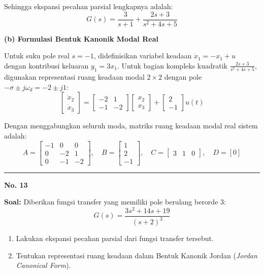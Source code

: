 \documentclass[11pt,a4paper]{article}
\begin{document}
Sehingga ekspansi pecahan parsial lengkapnya adalah:
$$G(s) = \frac{3}{s+1} + \frac{2s + 3}{s^2 + 4s + 5}$$

\textbf{(b) Formulasi Bentuk Kanonik Modal Real}

Untuk suku pole real $s = -1$, didefinisikan variabel keadaan $\dot{x}_1 = -x_1 + u$ dengan kontribusi keluaran $y_1 = 3 x_1$.
Untuk bagian kompleks kuadratik $\frac{2s+3}{s^2+4s+5}$, digunakan representasi ruang keadaan modal $2\times 2$ dengan pole $-\sigma \pm j\omega_d = -2 \pm j1$:
$$\begin{bmatrix} \dot{x}_2 \\ \dot{x}_3 \end{bmatrix} = \begin{bmatrix} -2 & 1 \\ -1 & -2 \end{bmatrix} \begin{bmatrix} x_2 \\ x_3 \end{bmatrix} + \begin{bmatrix} 2 \\ -1 \end{bmatrix} u(t)$$

Dengan menggabungkan seluruh moda, matriks ruang keadaan modal real sistem adalah:
$$A = \begin{bmatrix} -1 & 0 & 0 \\ 0 & -2 & 1 \\ 0 & -1 & -2 \end{bmatrix}, \quad B = \begin{bmatrix} 1 \\ 2 \\ -1 \end{bmatrix}, \quad C = \begin{bmatrix} 3 & 1 & 0 \end{bmatrix}, \quad D = [0]$$

\vspace{12pt}
\hrule
\vspace{10pt}

\textbf{\large No. 13}

\textbf{Soal:}  
Diberikan fungsi transfer yang memiliki pole berulang berorde 3:
$$G(s) = \frac{3s^2 + 14s + 19}{(s + 2)^3}$$
\begin{enumerate}[label=(\alph*)]
    \item Lakukan ekspansi pecahan parsial dari fungsi transfer tersebut.
    \item Tentukan representasi ruang keadaan dalam Bentuk Kanonik Jordan (\textit{Jordan Canonical Form}).
\end{enumerate}
\end{document}
